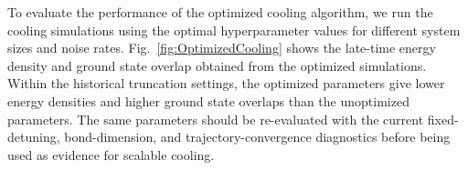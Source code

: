 \documentclass[aps,pra,twocolumn,superscriptaddress,nolongbibliography,nobalancelastpage,10pt]{revtex4-2}
\begin{document}

To evaluate the performance of the optimized cooling algorithm, we run the cooling simulations using the optimal hyperparameter values for different system sizes and noise rates. Fig.~\ref{fig:OptimizedCooling} shows the late-time energy density and ground state overlap obtained from the optimized simulations. Within the historical truncation settings, the optimized parameters give lower energy densities and higher ground state overlaps than the unoptimized parameters. The same parameters should be re-evaluated with the current fixed-detuning, bond-dimension, and trajectory-convergence diagnostics before being used as evidence for scalable cooling.
\end{document}
